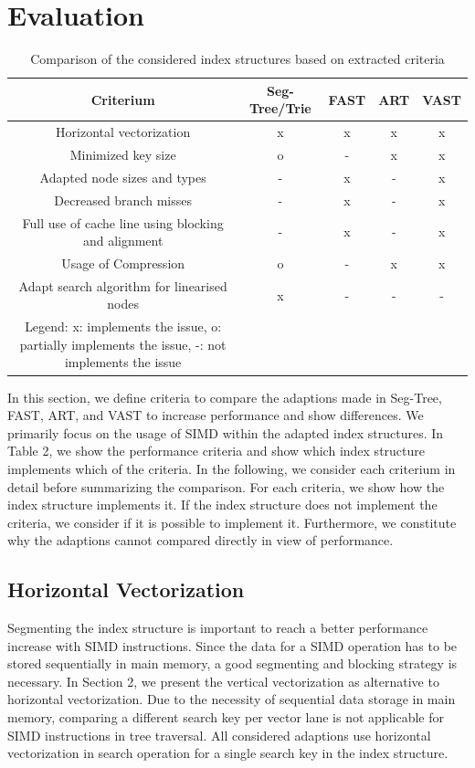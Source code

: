 \documentclass[conference]{IEEEtran}
\begin{document}
\section{Evaluation}
\begin{table}[htbp]
	\caption{Comparison of the considered index structures based on extracted criteria}
	\begin{center}
		\begin{tabular}{|c|c|c|c|c|}
			\hline
			\textbf{Criterium}&\textbf{Seg-Tree/Trie}&\textbf{FAST}&\textbf{ART}&\textbf{VAST}\\
			\hline
			Horizontal vectorization & x & x & x & x\\
			Minimized key size & o & - & x & x\\
			Adapted node sizes and types & - & x & - & x\\
			Decreased branch misses & - & x & - & x\\
			Full use of cache line using blocking and alignment & - & x & - & x\\
			Usage of Compression & o & - & x & x\\
			Adapt search algorithm for linearised nodes & x & - & - & -\\
			\hline
			Legend: x: implements the issue, o: partially implements the issue, -: not implements the issue & & & &\\
			\hline
		\end{tabular}
		\label{tab1}
	\end{center}
\end{table}
In this section, we define criteria to compare the adaptions made in Seg-Tree, FAST, ART, and VAST to increase performance and show differences. We primarily focus on the usage of SIMD within the adapted index structures. %
In Table 2, we show the performance criteria and show which index structure implements which of the criteria. In the following, we consider each criterium in detail before summarizing the comparison. For each criteria, we show how the index structure implements it. If the index structure does not implement the criteria, we consider if it is possible to implement it. Furthermore, we constitute why the adaptions cannot compared directly in view of performance.

\subsection{Horizontal Vectorization}
Segmenting the index structure is important to reach a better performance increase with SIMD instructions. Since the data for a SIMD operation has to be stored sequentially in main memory, a good segmenting and blocking strategy is necessary. In Section 2, we present the vertical vectorization as alternative to horizontal vectorization. Due to the necessity of sequential data storage in main memory, comparing a different search key per vector lane is not applicable for SIMD instructions in tree traversal. All considered adaptions use horizontal vectorization in search operation for a single search key in the index structure.
\end{document}
